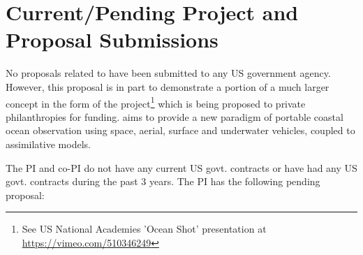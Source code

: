 \section{Current/Pending Project and Proposal Submissions}
\label{sec:current}

No proposals related to \proj have been submitted to any US government
agency. However, this proposal is in part to demonstrate a portion of
a much larger concept in the form of the \met project\footnote{See US
  National Academies 'Ocean Shot' presentation at
  \url{https://vimeo.com/510346249}} which is being proposed to
private philanthropies for funding. \met aims to provide a new
paradigm of portable coastal ocean observation using space, aerial,
surface and underwater vehicles, coupled to assimilative models.



The PI and co-PI do not have any current US govt. contracts or have
had any US govt. contracts during the past 3 years. The PI has the
following pending proposal:

